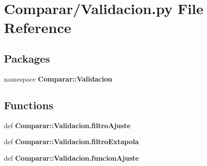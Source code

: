 \section{\-Comparar/\-Validacion.py \-File \-Reference}
\label{_validacion_8py}
\subsection*{\-Packages}
\begin{DoxyCompactItemize}
\item 
namespace {\bf \-Comparar\-::\-Validacion}
\end{DoxyCompactItemize}
\subsection*{\-Functions}
\begin{DoxyCompactItemize}
\item 
def {\bf \-Comparar\-::\-Validacion.\-filtro\-Ajuste}
\item 
def {\bf \-Comparar\-::\-Validacion.\-filtro\-Extapola}
\item 
def {\bf \-Comparar\-::\-Validacion.\-funcion\-Ajuste}
\end{DoxyCompactItemize}

